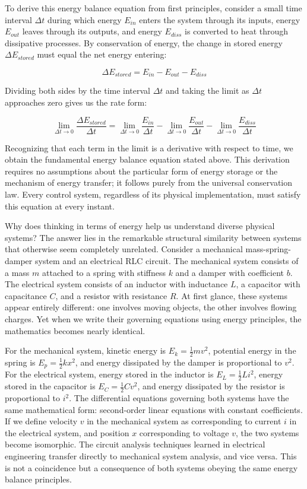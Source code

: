 To derive this energy balance equation from first principles, consider a small time interval $\Delta t$ during which energy $E_{in}$ enters the system through its inputs, energy $E_{out}$ leaves through its outputs, and energy $E_{diss}$ is converted to heat through dissipative processes. By conservation of energy, the change in stored energy $\Delta E_{stored}$ must equal the net energy entering:

$$\Delta E_{stored} = E_{in} - E_{out} - E_{diss}$$

Dividing both sides by the time interval $\Delta t$ and taking the limit as $\Delta t$ approaches zero gives us the rate form:

$$\lim_{\Delta t \to 0} \frac{\Delta E_{stored}}{\Delta t} = \lim_{\Delta t \to 0} \frac{E_{in}}{\Delta t} - \lim_{\Delta t \to 0} \frac{E_{out}}{\Delta t} - \lim_{\Delta t \to 0} \frac{E_{diss}}{\Delta t}$$

Recognizing that each term in the limit is a derivative with respect to time, we obtain the fundamental energy balance equation stated above. This derivation requires no assumptions about the particular form of energy storage or the mechanism of energy transfer; it follows purely from the universal conservation law. Every control system, regardless of its physical implementation, must satisfy this equation at every instant.

Why does thinking in terms of energy help us understand diverse physical systems? The answer lies in the remarkable structural similarity between systems that otherwise seem completely unrelated. Consider a mechanical mass-spring-damper system and an electrical RLC circuit. The mechanical system consists of a mass $m$ attached to a spring with stiffness $k$ and a damper with coefficient $b$. The electrical system consists of an inductor with inductance $L$, a capacitor with capacitance $C$, and a resistor with resistance $R$. At first glance, these systems appear entirely different: one involves moving objects, the other involves flowing charges. Yet when we write their governing equations using energy principles, the mathematics becomes nearly identical.

For the mechanical system, kinetic energy is $E_k = \frac{1}{2}mv^2$, potential energy in the spring is $E_p = \frac{1}{2}kx^2$, and energy dissipated by the damper is proportional to $v^2$. For the electrical system, energy stored in the inductor is $E_L = \frac{1}{2}Li^2$, energy stored in the capacitor is $E_C = \frac{1}{2}Cv^2$, and energy dissipated by the resistor is proportional to $i^2$. The differential equations governing both systems have the same mathematical form: second-order linear equations with constant coefficients. If we define velocity $v$ in the mechanical system as corresponding to current $i$ in the electrical system, and position $x$ corresponding to voltage $v$, the two systems become isomorphic. The circuit analysis techniques learned in electrical engineering transfer directly to mechanical system analysis, and vice versa. This is not a coincidence but a consequence of both systems obeying the same energy balance principles.

